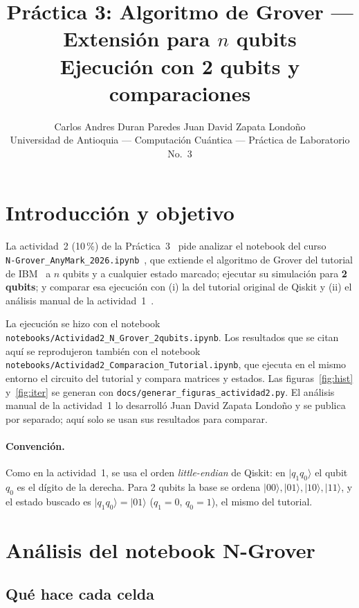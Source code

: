 \documentclass[11pt,a4paper]{article}
\title{Práctica 3: Algoritmo de Grover --- Extensión para $n$ qubits\\[2pt]
\large Ejecución con 2 qubits y comparaciones}
\author{Carlos Andres Duran Paredes \quad Juan David Zapata Londoño\\[4pt]\small Universidad de Antioquia --- Computación Cuántica --- Práctica de Laboratorio No.~3}
\date{}
\providecommand{\ket}{}\renewcommand{\ket}[1]{\lvert #1\rangle}
\begin{document}
\maketitle
\vspace{-0.6cm}

\section{Introducción y objetivo}

La actividad~2 (10\,\%) de la Práctica~3~\cite{enunciado} pide analizar el notebook del curso\\
\texttt{N-Grover\_AnyMark\_2026.ipynb}~\cite{ngrover}, que extiende el algoritmo de Grover del
tutorial de IBM~\cite{ibm} a $n$ qubits y a cualquier estado marcado; ejecutar su simulación para
\textbf{2 qubits}; y comparar esa ejecución con (i) la del tutorial original de Qiskit y (ii) el
análisis manual de la actividad~1~\cite{parte1,pasoapaso}.

La ejecución se hizo con el notebook \texttt{notebooks/Actividad2\_N\_Grover\_2qubits.ipynb}. Los resultados que se
citan aquí se reprodujeron también con el notebook\\
\texttt{notebooks/Actividad2\_Comparacion\_Tutorial.ipynb}, que ejecuta
en el mismo entorno el circuito del tutorial y compara matrices y estados. Las figuras~\ref{fig:hist} y~\ref{fig:iter} se generan con
\texttt{docs/generar\_figuras\_actividad2.py}. El análisis manual de la actividad~1 lo desarrolló Juan David Zapata Londoño y se
publica por separado; aquí solo se usan sus resultados para comparar.

\paragraph{Convención.} Como en la actividad~1, se usa el orden \emph{little-endian} de Qiskit:
en $\ket{q_1q_0}$ el qubit $q_0$ es el dígito de la derecha. Para 2 qubits la base se ordena
$\ket{00},\ket{01},\ket{10},\ket{11}$, y el estado buscado es $\ket{q_1q_0}=\ket{01}$
($q_1=0$, $q_0=1$), el mismo del tutorial.

\section{Análisis del notebook N-Grover}

\subsection{Qué hace cada celda}
\end{document}
